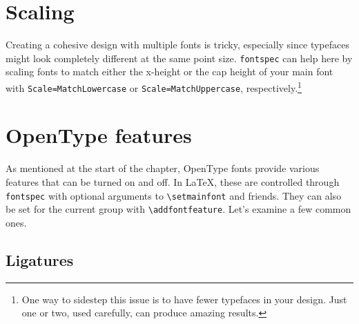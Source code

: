 \section{Scaling}

Creating a cohesive design with multiple fonts is tricky,
especially since typefaces might look completely different
at the same point size.
\texttt{fontspec} can help here by scaling fonts to match either the
x-height or the cap height of your main font with
\verb|Scale=MatchLowercase| or \verb|Scale=MatchUppercase|,
respectively.\footnote{One way to sidestep this issue is to have fewer
typefaces in your design. Just one or two,
used carefully, can produce amazing results.}


\section{OpenType features}

As mentioned at the start of the chapter,
OpenType fonts provide various features that can be turned on and off.
In \LaTeX{}, these are controlled through \texttt{fontspec}
with optional arguments to \verb|\setmainfont| and friends.
They can also be set for the current group with
\verb|\addfontfeature|.
Let's examine a few common ones.

\subsection{Ligatures}


